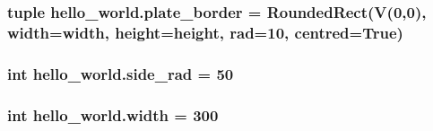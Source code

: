 \subsubsection[{plate\+\_\+border}]{\setlength{\rightskip}{0pt plus 5cm}tuple hello\+\_\+world.\+plate\+\_\+border = Rounded\+Rect(V(0,0), {\bf width}={\bf width}, {\bf height}={\bf height}, rad=10, centred=True)}\label{namespacehello__world_aae96ddc88251a81fdf48adb9742a0446}
\hypertarget{namespacehello__world_a53f83f437455b27ae9b7e025862ec9f3}{}
\subsubsection[{side\+\_\+rad}]{\setlength{\rightskip}{0pt plus 5cm}int hello\+\_\+world.\+side\+\_\+rad = 50}\label{namespacehello__world_a53f83f437455b27ae9b7e025862ec9f3}
\hypertarget{namespacehello__world_af811fa12a5ca10d11c44508bdb06132f}{}
\subsubsection[{width}]{\setlength{\rightskip}{0pt plus 5cm}int hello\+\_\+world.\+width = 300}\label{namespacehello__world_af811fa12a5ca10d11c44508bdb06132f}
